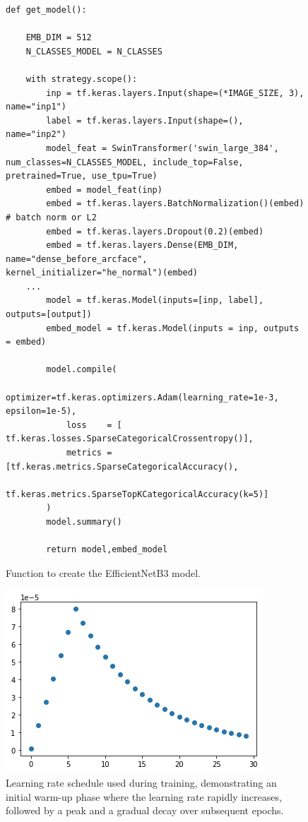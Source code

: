 \documentclass[twocolumn]{article}
\begin{document}
\begin{figure}[H]
\begin{minipage}{1.05\linewidth}
\begin{lstlisting}
def get_model():

    EMB_DIM = 512
    N_CLASSES_MODEL = N_CLASSES

    with strategy.scope():
        inp = tf.keras.layers.Input(shape=(*IMAGE_SIZE, 3), name="inp1")
        label = tf.keras.layers.Input(shape=(), name="inp2")
        model_feat = SwinTransformer('swin_large_384', num_classes=N_CLASSES_MODEL, include_top=False, pretrained=True, use_tpu=True)
        embed = model_feat(inp)
        embed = tf.keras.layers.BatchNormalization()(embed) # batch norm or L2
        embed = tf.keras.layers.Dropout(0.2)(embed)
        embed = tf.keras.layers.Dense(EMB_DIM, name="dense_before_arcface", kernel_initializer="he_normal")(embed)
    ...
        model = tf.keras.Model(inputs=[inp, label], outputs=[output])
        embed_model = tf.keras.Model(inputs = inp, outputs = embed)

        model.compile(
            optimizer=tf.keras.optimizers.Adam(learning_rate=1e-3, epsilon=1e-5),
            loss    = [ tf.keras.losses.SparseCategoricalCrossentropy()],
            metrics = [tf.keras.metrics.SparseCategoricalAccuracy(),
                       tf.keras.metrics.SparseTopKCategoricalAccuracy(k=5)]
        )
        model.summary()
        
        return model,embed_model
\end{lstlisting}
\end{minipage}
\caption{Function to create the EfficientNetB3 model.}
\end{figure}

\begin{figure}[H]
    \centering
    \includegraphics[width=0.5\linewidth]{learning.png}
    \caption{Learning rate schedule used during training, demonstrating an initial warm-up phase where the learning rate rapidly increases, followed by a peak and a gradual decay over subsequent epochs.}
\end{figure}
\end{document}
